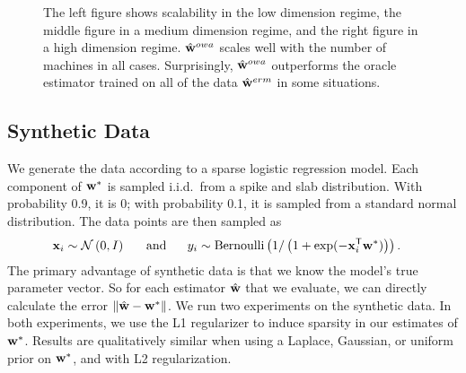 \documentclass[thesis.tex]{subfiles}
\begin{document}
\begin{figure*}[t]
\caption{
    The left figure shows scalability in the low dimension regime,
    the middle figure in a medium dimension regime,
    and the right figure in a high dimension regime.
    $\hat{\mathbf w}^{owa}$ scales well with the number of machines in all cases.
    Surprisingly, $\hat{\mathbf w}^{owa}$ outperforms the oracle estimator trained on all of the data $\hat{\mathbf w}^{erm}$ in some situations.
    \vspace{-0.1in}
    }
\label{fig:synscale}
\end{figure*}


\vspace{-0.1in}
\subsection{Synthetic Data}

\vspace{-0.05in}
We generate the data according to a sparse logistic regression model.
Each component of ${\mathbf w^{*}}$ is sampled i.i.d.\ from a spike and slab distribution.
With probability 0.9, it is 0;
with probability 0.1, it is sampled from a standard normal distribution.
The data points are then sampled as
\begin{equation}
\begin{aligned}
\mathbf{x}_i &\sim \mathcal{N}\left({{0}},{{I}}\right)
    \text{~~~~~and~~~~~}
y_i \sim \text{Bernoulli}\left(1/\left(1+\exp(-{\mathbf{x}}^{\mathsf{T}}_i{\mathbf w^{*}})\right)\right)
.
\end{aligned}
\end{equation}
The primary advantage of synthetic data is that we know the model's true parameter vector.
So for each estimator ${\hat{\mathbf w}}$ that we evaluate, we can directly calculate the error ${\lVert {{\hat{\mathbf w}}-{\mathbf w^{*}}} \rVert}$.
We run two experiments on the synthetic data.
In both experiments, we use the L1 regularizer to induce sparsity in our estimates of ${\mathbf w^{*}}$.
Results are qualitatively similar when using a Laplace, Gaussian, or uniform prior on ${\mathbf w^{*}}$, and with L2 regularization.
\end{document}
